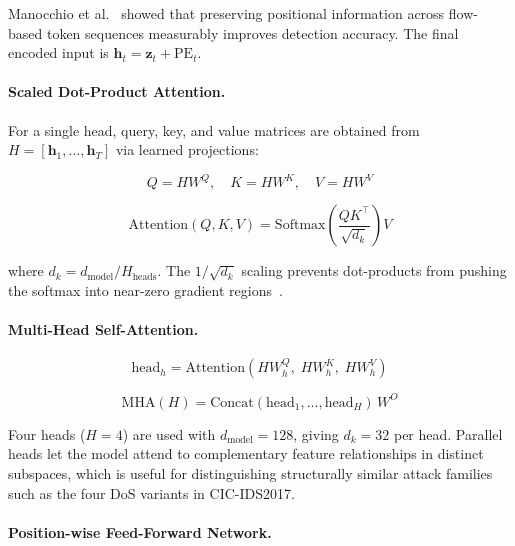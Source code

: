 \documentclass[5p,times]{elsarticle}
\begin{document}
	Manocchio et al.~\cite{flowformer2024} showed that preserving
	positional information across flow-based token sequences measurably
	improves detection accuracy. The final encoded input is
	$\mathbf{h}_t = \mathbf{z}_t + \mathrm{PE}_t$.
	
	\paragraph{Scaled Dot-Product Attention.}
	For a single head, query, key, and value matrices are obtained from
	$H = [\mathbf{h}_1, \ldots, \mathbf{h}_T]$ via learned projections:
	
	\begin{equation}
		Q = HW^Q, \quad K = HW^K, \quad V = HW^V
		\label{eq:qkv}
	\end{equation}
	
	\begin{equation}
		\mathrm{Attention}(Q,K,V) =
		\mathrm{Softmax}\!\!\left(\frac{QK^{\top}}{\sqrt{d_k}}\right)V
		\label{eq:attention}
	\end{equation}
	
	where $d_k = d_{\mathrm{model}} / H_{\mathrm{heads}}$. The
	$1/\sqrt{d_k}$ scaling prevents dot-products from pushing the softmax
	into near-zero gradient regions~\cite{vaswani2017attention}.
	
	\paragraph{Multi-Head Self-Attention.}
	
	\begin{equation}
		\mathrm{head}_h =
		\mathrm{Attention}(HW^Q_h,\; HW^K_h,\; HW^V_h)
		\label{eq:head}
	\end{equation}
	
	\begin{equation}
		\mathrm{MHA}(H) =
		\mathrm{Concat}(\mathrm{head}_1,\ldots,\mathrm{head}_H)\,W^O
		\label{eq:mha}
	\end{equation}
	
	Four heads ($H = 4$) are used with $d_{\mathrm{model}} = 128$, giving
	$d_k = 32$ per head. Parallel heads let the model attend to
	complementary feature relationships in distinct subspaces, which is
	useful for distinguishing structurally similar attack families such
	as the four DoS variants in CIC-IDS2017.
	
	\paragraph{Position-wise Feed-Forward Network.}
	
\end{document}
